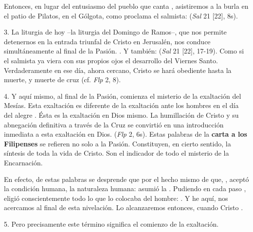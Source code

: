 \begin{body}
Entonces, en lugar del entusiasmo del pueblo que canta , asistiremos a la burla en el patio de Pilatos, en el Gólgota, como proclama el salmista:  (\textit{Sal} 21 [22], 8s).

3. La liturgia de hoy –la liturgia del Domingo de Ramos–, que nos permite detenernos en la entrada triunfal de Cristo en Jerusalén, nos conduce simultáneamente al final de la Pasión. . Y también:  (\textit{Sal} 21 [22], 17-19). Como si el salmista ya viera con sus propios ojos el desarrollo del Viernes Santo. Verdaderamente en ese día, ahora cercano, Cristo se hará obediente hasta la muerte, y muerte de cruz (cf. \textit{Flp} 2, 8).

4. Y aquí mismo, al final de la Pasión, comienza el misterio de la exaltación del Mesías. Esta exaltación es diferente de la exaltación  ante los hombres en el día del alegre . Ésta es la exaltación en Dios mismo. La humillación de Cristo y su abnegación definitiva a través de la Cruz se convirtió en una introducción inmediata a esta exaltación en Dios.  (\textit{Flp} 2, 6s). Estas palabras de la \textbf{carta a los Filipenses} se refieren no solo a la Pasión. Constituyen, en cierto sentido, la síntesis de toda la vida de Cristo. Son el indicador de todo el misterio de la Encarnación.

En efecto, de estas palabras se desprende que  por el hecho mismo de que, , aceptó la condición humana, la naturaleza humana: asumió la . Pudiendo en cada paso , eligió conscientemente todo lo que lo colocaba  del hombre: . Y he aquí, nos acercamos al final de esta nivelación. Lo alcanzaremos entonces, cuando Cristo .

5. Pero precisamente este término significa el comienzo de la exaltación.


\end{body}
